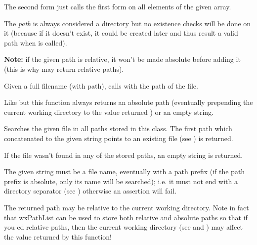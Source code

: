 The second form just calls the first form on all elements of the given array.

The {\it path} is always considered a directory but no existence checks will be done on it
(because if it doesn't exist, it could be created later and thus result a valid path when
 is called).

{\bf Note:} if the given path is relative, it won't be made absolute before adding it
(this is why  may return relative paths).


\label{wxpathlistensurefileaccessible}


Given a full filename (with path), calls  with the path
of the file.


\label{wxpathlistfindabsolutepath}


Like  but this function always
returns an absolute path (eventually prepending the current working directory
to the value returned ) or an
empty string.


\label{wxpathlistfindvalidpath}


Searches the given file in all paths stored in this class.
The first path which concatenated to the given string points to an existing
file (see ) is returned.

If the file wasn't found in any of the stored paths, an empty string is returned.

The given string must be a file name, eventually with a path prefix (if the path
prefix is absolute, only its name will be searched); i.e. it must not end with
a directory separator (see )
otherwise an assertion will fail.

The returned path may be relative to the current working directory.
Note in fact that wxPathList can be used to store both relative and absolute paths so that
if you ed relative paths, then the current working directory
(see  and )
may affect the value returned by this function!

